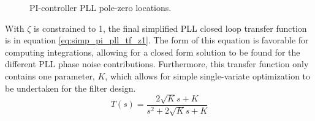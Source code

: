 			\begin{figure}[htb!]
				\center
				\caption{PI-controller PLL pole-zero locations.}
				\label{fig:pi_pll_pz}
			\end{figure}
			\FloatBarrier
			With $\zeta$ is constrained to 1, the final simplified PLL closed loop transfer function is in equation \ref{eq:simp_pi_pll_tf_z1}. The form of this equation is favorable for computing integrations, allowing for a closed form solution to be found for the different PLL phase noise contributions. Furthermore, this transfer function only contains one parameter, $K$, which allows for simple single-variate optimization to be undertaken for the filter design.
			\begin{equation} \label{eq:simp_pi_pll_tf_z1}
				T(s) = \frac{2\sqrt{K}s + K }{s^2 + 2\sqrt{K}s + K}
			\end{equation}
			



